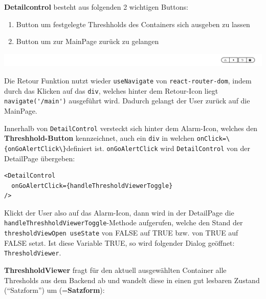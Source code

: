 \documentclass[
    headings=optiontotocandhead,%
    twoside,
    numbers=noenddot,%
    12pt, %
    titlepage, %
    parskip=full, %
    listof=leveldown, 
    numbers=noenddot, %
    a4paper,DIV=14,
    BCOR=15mm,
]{scrbook}
\newcommand{\passthrough}[1]{#1}
\let\origfigure=\figure
\let\endorigfigure=\endfigure
\renewenvironment{figure}[1][]{%
   \origfigure[H]
}{%
   \endorigfigure
}
\providecommand{\tightlist}{%
  \setlength{\itemsep}{0pt}\setlength{\parskip}{0pt}}
\begin{document}
\textbf{Detailcontrol} besteht aus folgenden 2 wichtigen Buttons:

\begin{enumerate}
\def\labelenumi{\arabic{enumi}.}
\tightlist
\item
  Button um festgelegte Threshholds des Containers sich ausgeben zu
  lassen
\item
  Button um zur MainPage zurück zu gelangen
\end{enumerate}

\begin{figure}
\centering
\includegraphics{img/Gekle/SearchbarDetail.png}
\caption{Topbar der DetailPage}
\end{figure}

Die Retour Funktion nutzt wieder \passthrough{\lstinline!useNavigate!}
von \passthrough{\lstinline!react-router-dom!}, indem durch das Klicken
auf das \passthrough{\lstinline!div!}, welches hinter dem Retour-Icon
liegt \passthrough{\lstinline!navigate('/main')!} ausgeführt wird.
Dadurch gelangt der User zurück auf die MainPage.

Innerhalb von \passthrough{\lstinline!DetailControl!} versteckt sich
hinter dem Alarm-Icon, welches den \textbf{Threshhold-Button}
kennzeichnet, auch ein \passthrough{\lstinline!div!} in welchen
\passthrough{\lstinline!onClick=\{onGoAlertClick\}!}definiert ist.
\passthrough{\lstinline!onGoAlertClick!} wird
\passthrough{\lstinline!DetailControl!} von der DetailPage übergeben:

\begin{lstlisting}[caption={Implementierung von DetailControl in der Topbar der DetailPage}]
<DetailControl
  onGoAlertClick={handleThresholdViewerToggle}
/>
\end{lstlisting}

Klickt der User also auf das Alarm-Icon, dann wird in der DetailPage die
\passthrough{\lstinline!handleThreshholdViewerToggle!}-Methode
aufgerufen, welche den Stand der
\passthrough{\lstinline!thresholdViewOpen useState!} von FALSE auf TRUE
bzw. von TRUE auf FALSE setzt. Ist diese Variable TRUE, so wird
folgender Dialog geöffnet: \passthrough{\lstinline!ThresholdViewer!}.

\textbf{ThreshholdViewer} fragt für den aktuell ausgewählten Container
alle Thresholds aus dem Backend ab und wandelt diese in einen gut
lesbaren Zustand (``Satzform'') um (=\textbf{Satzform}):
\end{document}
